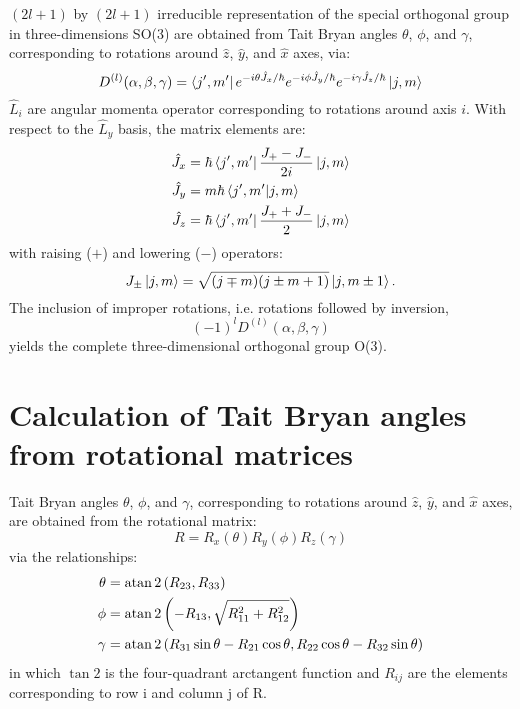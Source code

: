 \documentclass[preprint,showpacs,preprintnumbers,superscriptaddress,prb,floatfix,aps]{revtex4-1}
\begin{document}
$(2l+1)$ by $(2l+1)$ irreducible representation of the special orthogonal group in three-dimensions SO(3) are obtained from Tait Bryan angles $\theta$, $\phi$, and $\gamma$, corresponding to rotations around $\hat{z}$, $\hat{y}$, and $\hat{x}$ axes, via:\cite{martin_electronic_2004}
\begin{equation}
\label{eq:imselfenergy}
D^{(l)}(\alpha,\beta,\gamma) = \bra{j',m'} e^{-i\theta\hat{J}_x/\hbar} e^{-i\phi\hat{J}_y/\hbar} e^{-i\gamma\hat{J}_z/\hbar} \ket{j,m}
\end{equation}
$\hat{L}_i$ are angular momenta operator corresponding to rotations around axis $i$. With respect to the $\hat{L}_y$ basis, the matrix elements are:\cite{shankar_fundamentals_2014}
\begin{align}
\label{eq:angular_momenta}
\hat{J}_x & = \hbar \bra{j',m'} \frac{J_{+}-J_{-}}{2i} \ket{j,m} \\
\hat{J}_y & = m \hbar \braket{j',m'}{j,m} \\
\hat{J}_z & = \hbar \bra{j',m'} \frac{J_{+}+J_{-}}{2} \ket{j,m}
\end{align}
with raising ($+$) and lowering ($-$) operators:
\begin{equation}
\label{eq:raising_lowering_operator}
J_{\pm}\ket{j,m} = \sqrt{(j\mp m)(j\pm m+1)}\ket{j,m\pm1}.
\end{equation}
The inclusion of improper rotations, i.e. rotations followed by inversion,\cite{el-batanouny_symmetry_2008}
\begin{equation}
\label{eq:improper_rotation}
(-1)^{l} D^{(l)}(\alpha,\beta,\gamma)
\end{equation}
yields the complete three-dimensional orthogonal group O(3).


\section{Calculation of Tait Bryan angles from rotational matrices}

Tait Bryan angles $\theta$, $\phi$, and $\gamma$, corresponding to rotations around $\hat{z}$, $\hat{y}$, and $\hat{x}$ axes, are obtained from the rotational matrix:
\begin{equation}
\label{eq:rotation}
R = R_x(\theta)R_y(\phi)R_z(\gamma)
\end{equation}
via the relationships:
\begin{align}
\label{eq:tait_bryan_angles}
\theta & = \atan2\left(R_{23},R_{33}\right) \\
\phi   & = \atan2\left(-R_{13},\sqrt{R_{11}^2+R_{12}^2}\right) \\
\gamma & = \atan2\left(R_{31}\sin{\theta}-R_{21}\cos{\theta},R_{22}\cos{\theta}-R_{32}\sin{\theta}\right)
\end{align}
in which $\tan2$ is the four-quadrant arctangent function and $R_{ij}$ are the elements corresponding to row i and column j of R.
\end{document}

